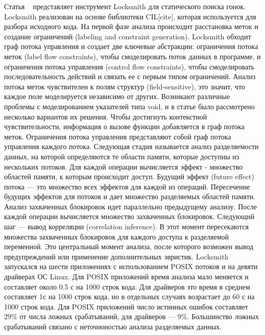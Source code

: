 Статья ~\cite{Pratikakis:2011} представляет инструмент Locksmith для статического поиска гонок.
Locksmith реализован на основе библиотеки CIL[cite], которая используется для разбора исходного кода.
На первой фазе анализа происходит расстановка меток и создание ограничений (labeling and constraint generation). Locksmith обходит граф потока управления и создает две ключевые абстракции: ограничения потока меток (label flow constraints), чтобы смоделировать поток данных в программе, и ограничения потока управления (control flow constraints), чтобы смоделировать последовательность действий и связать ее с первым типом ограничений. Анализ потока меток чувствителен к полям структур (field-sensitive), это значит, что каждое поле моделируется независимо от других. Возникают различные проблемы с моделированием указателей типа void, и в статье было рассмотрено несколько вариантов их решения. Чтобы достигнуть контекстной чувствительности, информация о вызове функции добавляется в граф потока меток. Ограничения потока управления представляют собой граф потока управления каждого потока.
Следующая стадия называется анализ разделяемости данных, на которой определяются те области памяти, которые доступны из нескольких потоков. Для каждой операции вычисляется эффект - множество областей памяти, к которым происходит доступ. Будущий эффект (future effect) потока — это множество всех эффектов для каждой из операций. Пересечение будущих эффектов для потоков и дает множество разделяемых областей памяти.
Анализ захваченных блокировок идет параллельно предыдущему анализу. После каждой операции вычисляется множество захваченных блокировок.
Следующий шаг — вывод корреляции (correlation inference). В этот момент пересекаются множества захваченных блокировок для каждого доступа к разделяемой переменной. Это центральный момент анализа, после которого возможен вывод предупреждений или применение дополнительных эвристик.
Locksmith запускался на шести приложениях с использованием POSIX потоков и на девяти драйверах ОС Linux. Для POSIX приложений время анализа мало меняется и составляет около 0.5 с на 1000 строк кода. Для драйверов это время в среднем составляет 1с на 1000 строк кода, но в отдельных случаях возрастает до 60 с на 1000 строк кода. Для POSIX приложений число истинных ошибок составляет 29\% от числа ложных срабатываний, для драйверов — 9\%. Большинство ложных срабатываний связано с неточноностью анализа разделяемых данных.

